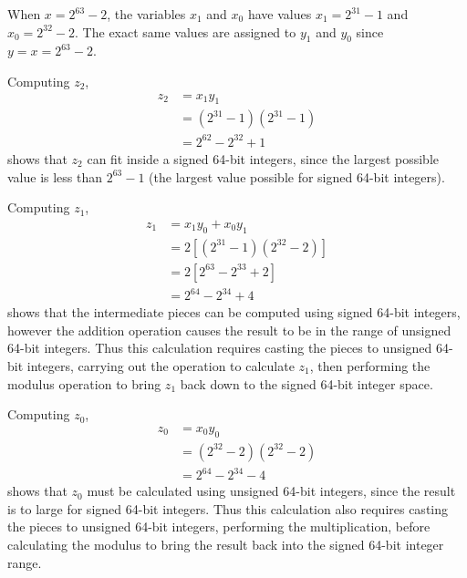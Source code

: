 When $x = 2^{63} - 2$, the variables $x_1$ and $x_0$ have values $x_1 = 2^{31} - 1$ and $x_0 = 2^{32} - 2$. The exact same values are assigned to $y_1$ and $y_0$ since $y = x = 2^{63} - 2$. 

Computing $z_2$,
\begin{equation}
\begin{split}
z_2 & = x_1 y_1\\
 & = (2^{31} - 1) (2^{31} - 1)\\
 & = 2^{62} - 2^{32} + 1
\end{split}
\end{equation}
shows that $z_2$ can fit inside a signed 64-bit integers, since the largest possible value is less than $2^{63} - 1$ (the largest value possible for signed 64-bit integers). 

Computing $z_1$,
\begin{equation}
\begin{split}
z_1 & = x_1 y_0 + x_0 y_1\\
 & = 2[(2^{31} - 1) (2^{32} - 2)]\\
 & = 2[2^{63} - 2^{33} + 2]\\
 & = 2^{64} - 2^{34} + 4
\end{split}
\end{equation}
shows that the intermediate pieces can be computed using signed 64-bit integers, however the addition operation causes the result to be in the range of unsigned 64-bit integers. Thus this calculation requires casting the pieces to unsigned 64-bit integers, carrying out the operation to calculate $z_1$, then performing the modulus operation to bring $z_1$ back down to the signed 64-bit integer space.

Computing $z_0$,
\begin{equation}
\begin{split}
z_0 & = x_0 y_0\\
 & = (2^{32} - 2) (2^{32} - 2)\\
 & = 2^{64} - 2^{34} - 4
\end{split}
\end{equation}
shows that $z_0$ must be calculated using unsigned 64-bit integers, since the result is to large for signed 64-bit integers. Thus this calculation also requires casting the pieces to unsigned 64-bit integers, performing the multiplication, before calculating the modulus to bring the result back into the signed 64-bit integer range.


